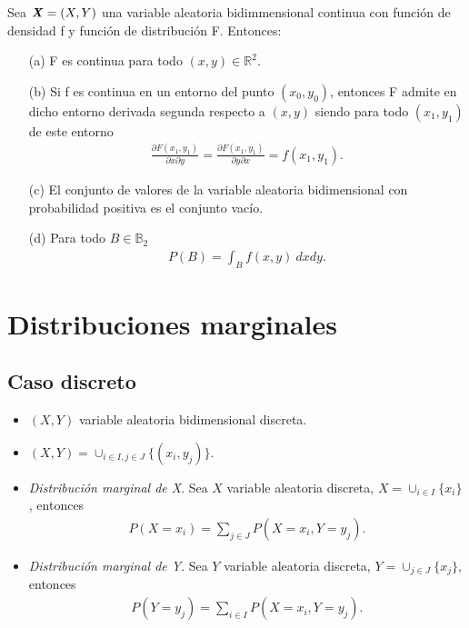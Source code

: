 \begin{teo}
    Sea $\textbf{\textit{X}} = (X,Y)$ una variable aleatoria bidimmensional continua con función de densidad f y función de distribución F. Entonces:
    \begin{enumerate}
        \item[(a)] F es continua para todo $(x,y) \in \mathbb{R}^2$.
        \item[(b)] Si f es continua en un entorno del punto $(x_0,y_0)$, entonces F admite en dicho entorno derivada segunda respecto a $(x,y)$ siendo para todo $(x_1,y_1)$ de este entorno
              \begin{align*}
                  \frac{\partial F(x_1,y_1)}{\partial x \partial y} = \frac{\partial F(x_1, y_1)}{\partial y \partial x} = f(x_1,y_1).
              \end{align*}
        \item[(c)] El conjunto de valores de la variable aleatoria bidimensional con probabilidad positiva es el conjunto vacío.
        \item[(d)] Para todo $B \in \mathbb{B}_2$
              \begin{align*}
                  P(B) = \int_{B}{f(x,y) \ dxdy}.
              \end{align*}
    \end{enumerate}
\end{teo}

\section{Distribuciones marginales}

\subsection{Caso discreto}
\begin{itemize}
    \item $(X,Y)$ variable aleatoria bidimensional discreta.
    \item $(X,Y) = \cup_{i \in I, j \in J}{\{(x_i,y_j)\}}$.
    \item \textit{Distribución marginal de X}. Sea $X$ variable aleatoria discreta, $X = \cup_{i \in I}{\{x_i\}}$, entonces
          \begin{align*}
              P(X = x_i) = \sum_{j \in J}{P(X = x_i, Y = y_j)}.
          \end{align*}
    \item \textit{Distribución marginal de Y}. Sea $Y$ variable aleatoria discreta, $Y = \cup_{j \in J}{\{x_j\}}$, entonces
          \begin{align*}
              P(Y = y_j) = \sum_{i \in I}{P(X = x_i, Y = y_j)}.
          \end{align*}
\end{itemize}


